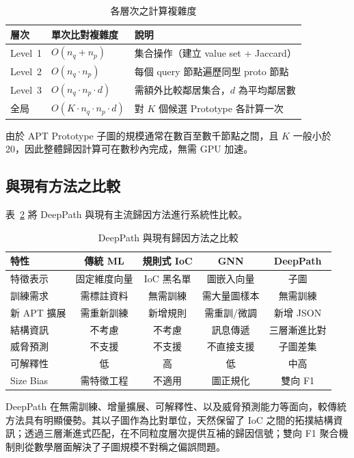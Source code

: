 \begin{ZhChapter}
\begin{table}[htbp]
    \centering
    \caption{各層次之計算複雜度}
    \label{tab:complexity}
    \renewcommand\arraystretch{1.2}
    \begin{tabular}{l l l}
        \hline
        \textbf{層次} & \textbf{單次比對複雜度} & \textbf{說明} \\
        \hline
        Level~1 & $O(n_q + n_p)$ & 集合操作（建立 value set + Jaccard） \\
        Level~2 & $O(n_q \cdot n_p)$ & 每個 query 節點遍歷同型 proto 節點 \\
        Level~3 & $O(n_q \cdot n_p \cdot d)$ & 需額外比較鄰居集合，$d$ 為平均鄰居數 \\
        全局 & $O(K \cdot n_q \cdot n_p \cdot d)$ & 對 $K$ 個候選 Prototype 各計算一次 \\
        \hline
    \end{tabular}
\end{table}

由於 APT Prototype 子圖的規模通常在數百至數千節點之間，且 $K$ 一般小於 20，因此整體歸因計算可在數秒內完成，無需 GPU 加速。


\subsection{與現有方法之比較}
\label{subsec:comparison}

表~\ref{tab:method-comparison} 將 DeepPath 與現有主流歸因方法進行系統性比較。

\begin{table}[htbp]
    \centering
    \caption{DeepPath 與現有歸因方法之比較}
    \label{tab:method-comparison}
    \renewcommand\arraystretch{1.2}
    \begin{tabular}{l c c c c}
        \hline
        \textbf{特性} & \textbf{傳統 ML} & \textbf{規則式 IoC} & \textbf{GNN} & \textbf{DeepPath} \\
        \hline
        特徵表示     & 固定維度向量 & IoC 黑名單 & 圖嵌入向量 & 子圖 \\
        訓練需求     & 需標註資料 & 無需訓練 & 需大量圖樣本 & 無需訓練 \\
        新 APT 擴展  & 需重新訓練 & 新增規則 & 需重訓/微調 & 新增 JSON \\
        結構資訊     & 不考慮 & 不考慮 & 訊息傳遞 & 三層漸進比對 \\
        威脅預測     & 不支援 & 不支援 & 不直接支援 & 子圖差集 \\
        可解釋性     & 低 & 高 & 低 & 中高 \\
        Size Bias    & 需特徵工程 & 不適用 & 圖正規化 & 雙向 F1 \\
        \hline
    \end{tabular}
\end{table}

DeepPath 在無需訓練、增量擴展、可解釋性、以及威脅預測能力等面向，較傳統方法具有明顯優勢。其以子圖作為比對單位，天然保留了 IoC 之間的拓撲結構資訊；透過三層漸進式匹配，在不同粒度層次提供互補的歸因信號；雙向 F1 聚合機制則從數學層面解決了子圖規模不對稱之偏誤問題。

\end{ZhChapter}
